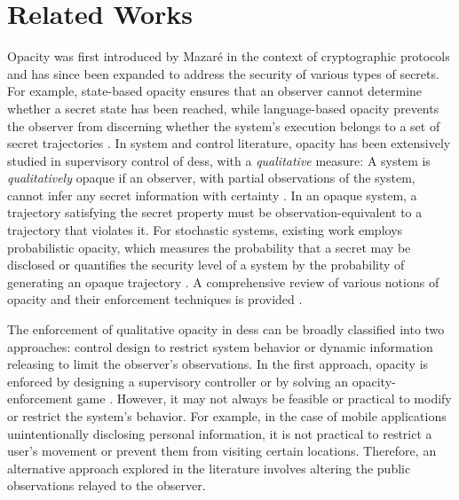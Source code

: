 \section{Related Works}
Opacity was first introduced by Mazar\'e \cite{mazare2004using}  in the context of cryptographic protocols and has since been expanded to address the security of various types of secrets. For example, state-based opacity ensures that an observer cannot determine whether a secret state has been reached, while language-based opacity prevents the observer from discerning whether the system's execution belongs to a set of secret trajectories \cite{berard2015probabilistic, bryans2008opacity, saboori2010opacity}. In system and control literature,
opacity has been extensively studied in supervisory control of \ac{des}s, with a \emph{qualitative} measure: A system is \emph{qualitatively} opaque if an observer, with partial observations of the system, cannot infer any secret information with certainty \cite{jacob2016overview, saboori2010verification, saboori2011opacity, wu2013comparative, yin2019infinite}. In an opaque system, a trajectory satisfying the secret property must be observation-equivalent to a trajectory that violates it.
For stochastic systems, existing work employs probabilistic opacity, which measures the probability that a secret may be disclosed \cite{saboori2010opacity, saboori2013current, keroglou2018probabilistic} or quantifies the security level of a system by the probability of generating an opaque trajectory \cite{berard2015probabilistic, udupa2024planning}. A comprehensive review of various notions of opacity and their enforcement techniques is provided \cite{jacob2016overview}. 

The enforcement of qualitative opacity in \ac{des}s can be broadly classified into two approaches:    control design to restrict system behavior or dynamic information releasing to limit the observer's observations. In the first approach, opacity is enforced by designing a supervisory controller \cite{saboori2010verification} or by solving an opacity-enforcement game \cite{helouet2018opacity,udupa2023opacity}. 
However, it may not always be feasible or practical to modify or restrict the system's behavior. For example, in the case of mobile applications unintentionally disclosing personal information, it is not practical to restrict a user's movement or prevent them from visiting certain locations. Therefore, an alternative approach explored in the literature involves altering the public observations relayed to the observer. 

